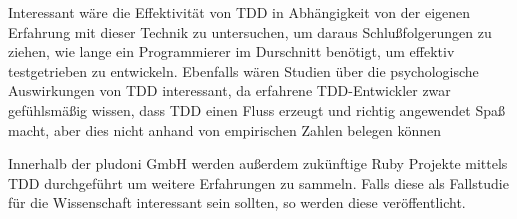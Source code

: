 Interessant wäre die Effektivität von TDD in Abhängigkeit von der eigenen Erfahrung mit dieser Technik zu untersuchen, um daraus Schlußfolgerungen zu ziehen, wie lange ein Programmierer im Durschnitt benötigt, um effektiv testgetrieben zu entwickeln. Ebenfalls wären Studien über die psychologische Auswirkungen von TDD interessant, da erfahrene TDD-Entwickler zwar gefühlsmäßig wissen, dass TDD einen Fluss erzeugt und richtig angewendet Spaß macht, aber dies nicht anhand von empirischen Zahlen belegen können

Innerhalb der pludoni GmbH werden außerdem zukünftige Ruby Projekte mittels TDD durchgeführt um weitere Erfahrungen zu sammeln. Falls diese als Fallstudie für die Wissenschaft interessant sein sollten, so werden diese veröffentlicht.

